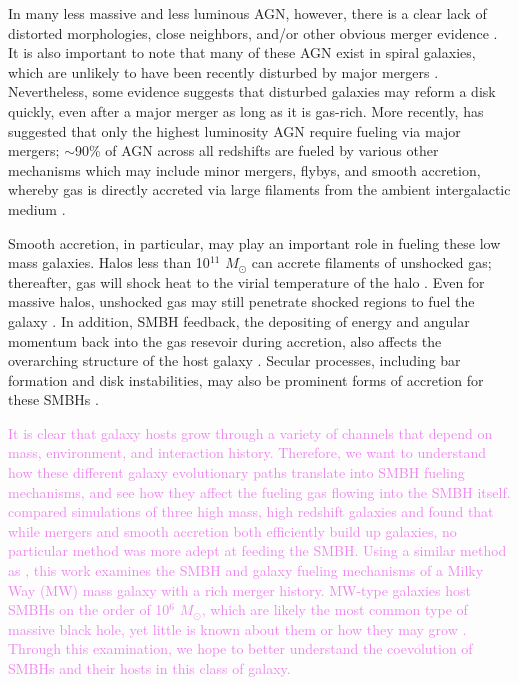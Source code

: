\documentclass[manuscript]{aastex}
\begin{document}
In many less massive and less luminous AGN, however, there is a clear lack of distorted morphologies, close neighbors, and/or other obvious merger evidence \citep{Ryan2007,Schawinski2011,Ellison2013,Hicks2013}. It is also important to note that many of these AGN exist in spiral galaxies, which are unlikely to have been recently disturbed by major mergers \citep{Springel2005,Kocevski2011}. Nevertheless, some evidence suggests \citep{vanGorkom1997,Governato2009} that disturbed galaxies may reform a disk quickly, even after a major merger as long as it is gas-rich. More recently, \cite{Treister2012} has suggested that only the highest luminosity AGN require fueling via major mergers; $\sim$90\% of AGN across all redshifts are fueled by various other mechanisms which may include minor mergers, flybys, and smooth accretion, whereby gas is directly accreted via large filaments from the ambient intergalactic medium \citep{Cox2006,Bellovary2013,Sinha2012}. 

Smooth accretion, in particular, may play an important role in fueling these low mass galaxies. Halos less than 10$^{11}$ $M_{\odot}$ can accrete filaments of unshocked gas; thereafter, gas will shock heat to the virial temperature of the halo \citep{Keres2005}. Even for massive halos, unshocked gas may still penetrate shocked regions to fuel the galaxy \citep{Brooks2007,Dekel2009,Nelson2013}. In addition, SMBH feedback, the depositing of energy and angular momentum back into the gas resevoir during accretion, also affects the overarching structure of the host galaxy \citep{Governato2009a}. Secular processes, including bar formation and disk instabilities, may also be prominent forms of accretion for these SMBHs \citep{Kormendy2013}. 

\textcolor{violet}{
It is clear that galaxy hosts grow through a variety of channels that depend on mass, environment, and interaction history. Therefore, we want to understand how these different galaxy evolutionary paths translate into SMBH fueling mechanisms, and see how they affect the fueling gas flowing into the SMBH itself. \cite{Bellovary2013} compared simulations of three high mass, high redshift galaxies and found that while mergers and smooth accretion both efficiently build up galaxies, no particular method was more adept at feeding the SMBH. Using a similar method as \cite{Bellovary2013}, this work examines the SMBH and galaxy fueling mechanisms of a Milky Way (MW) mass galaxy with a rich merger history. MW-type galaxies host SMBHs on the order of 10$^6$ $M_{\odot}$, which are likely the most common type of massive black hole, yet little is known about them or how they may grow \citep{Kormendy2013}. Through this examination, we hope to better understand the coevolution of SMBHs and their hosts in this class of galaxy. 
}
\end{document}
